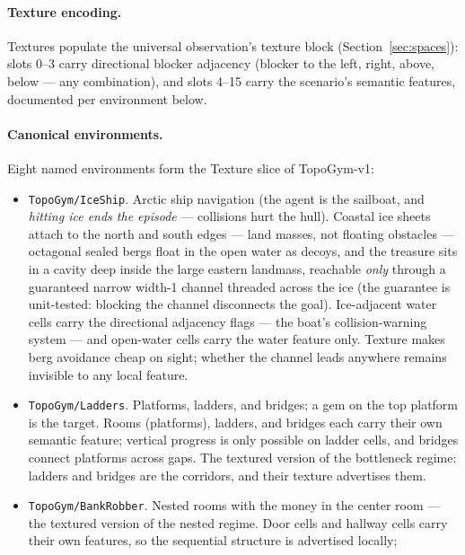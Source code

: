 \documentclass[11pt]{article}
\begin{document}
\paragraph{Texture encoding.} Textures populate the universal
observation's texture block (Section~\ref{sec:spaces}): slots 0--3
carry directional blocker adjacency (blocker to the left, right,
above, below --- any combination), and slots 4--15 carry the
scenario's semantic features, documented per environment below.

\paragraph{Canonical environments.} Eight named environments form the
Texture slice of TopoGym-v1:
\begin{itemize}[leftmargin=2em, itemsep=3pt]
  \item \texttt{TopoGym/IceShip}. Arctic ship navigation (the agent
        is the sailboat, and \emph{hitting ice ends the episode} ---
        collisions hurt the hull). Coastal ice sheets attach to the
        north and south edges --- land masses, not floating obstacles
        --- octagonal sealed bergs float in the open water as decoys,
        and the treasure sits in a cavity deep inside the large
        eastern landmass, reachable \emph{only} through a guaranteed
        narrow width-1 channel threaded across the ice (the guarantee
        is unit-tested: blocking the channel disconnects the goal).
        Ice-adjacent water cells carry the directional adjacency
        flags --- the boat's collision-warning system --- and
        open-water cells carry the water feature only. Texture makes
        berg avoidance cheap on sight; whether the channel leads
        anywhere remains invisible to any local feature.
  \item \texttt{TopoGym/Ladders}. Platforms, ladders, and bridges;
        a gem on the top platform is the target. Rooms (platforms),
        ladders, and bridges each carry their own semantic feature;
        vertical progress is only possible on ladder cells, and
        bridges connect platforms across gaps. The textured version
        of the bottleneck regime: ladders and bridges are the
        corridors, and their texture advertises them.
  \item \texttt{TopoGym/BankRobber}. Nested rooms with the money in
        the center room --- the textured version of the nested
        regime. Door cells and hallway cells carry their own
        features, so the sequential structure is advertised locally;

\end{itemize}
\end{document}
